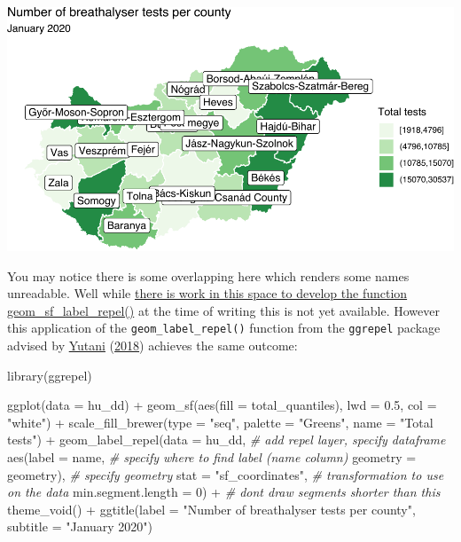 \documentclass[
]{book}
\newenvironment{Shaded}{\begin{snugshade}}{\end{snugshade}}
\newcommand{\AttributeTok}[1]{\textcolor[rgb]{0.77,0.63,0.00}{#1}}
\newcommand{\CommentTok}[1]{\textcolor[rgb]{0.56,0.35,0.01}{\textit{#1}}}
\newcommand{\DecValTok}[1]{\textcolor[rgb]{0.00,0.00,0.81}{#1}}
\newcommand{\FloatTok}[1]{\textcolor[rgb]{0.00,0.00,0.81}{#1}}
\newcommand{\FunctionTok}[1]{\textcolor[rgb]{0.00,0.00,0.00}{#1}}
\newcommand{\NormalTok}[1]{#1}
\newcommand{\SpecialCharTok}[1]{\textcolor[rgb]{0.00,0.00,0.00}{#1}}
\newcommand{\StringTok}[1]{\textcolor[rgb]{0.31,0.60,0.02}{#1}}
\begin{document}
\includegraphics{crime_mapping_files/figure-latex/addcountynames-1.pdf}

You may notice there is some overlapping here which renders some names unreadable. Well while \href{https://github.com/slowkow/ggrepel/issues/111}{there is work in this space to develop the function geom\_sf\_label\_repel()} at the time of writing this is not yet available. However this application of the \texttt{geom\_label\_repel()} function from the \texttt{ggrepel} package advised by \protect\hyperlink{ref-Yutani_2018}{Yutani} (\protect\hyperlink{ref-Yutani_2018}{2018}) achieves the same outcome:

\begin{Shaded}
\begin{Highlighting}[]
\FunctionTok{library}\NormalTok{(ggrepel)}

\FunctionTok{ggplot}\NormalTok{(}\AttributeTok{data =}\NormalTok{ hu\_dd) }\SpecialCharTok{+} 
  \FunctionTok{geom\_sf}\NormalTok{(}\FunctionTok{aes}\NormalTok{(}\AttributeTok{fill =}\NormalTok{ total\_quantiles), }
          \AttributeTok{lwd =} \FloatTok{0.5}\NormalTok{, }\AttributeTok{col =} \StringTok{"white"}\NormalTok{) }\SpecialCharTok{+} 
  \FunctionTok{scale\_fill\_brewer}\NormalTok{(}\AttributeTok{type =} \StringTok{"seq"}\NormalTok{, }
                    \AttributeTok{palette =} \StringTok{"Greens"}\NormalTok{, }
                    \AttributeTok{name =} \StringTok{"Total tests"}\NormalTok{) }\SpecialCharTok{+} 
  \FunctionTok{geom\_label\_repel}\NormalTok{(}\AttributeTok{data =}\NormalTok{ hu\_dd,       }\CommentTok{\# add repel layer, specify dataframe}
                   \FunctionTok{aes}\NormalTok{(}\AttributeTok{label =}\NormalTok{ name,   }\CommentTok{\# specify where to find label (name column)}
                       \AttributeTok{geometry =}\NormalTok{ geometry),  }\CommentTok{\# specify geometry}
                   \AttributeTok{stat =} \StringTok{"sf\_coordinates"}\NormalTok{,  }\CommentTok{\# transformation to use on the data}
                   \AttributeTok{min.segment.length =} \DecValTok{0}\NormalTok{) }\SpecialCharTok{+} \CommentTok{\# don\textquotesingle{}t draw segments shorter than this}
  \FunctionTok{theme\_void}\NormalTok{() }\SpecialCharTok{+} 
  \FunctionTok{ggtitle}\NormalTok{(}\AttributeTok{label =} \StringTok{"Number of breathalyser tests per county"}\NormalTok{, }
          \AttributeTok{subtitle =} \StringTok{"January 2020"}\NormalTok{) }
\end{Highlighting}
\end{Shaded}
\end{document}
